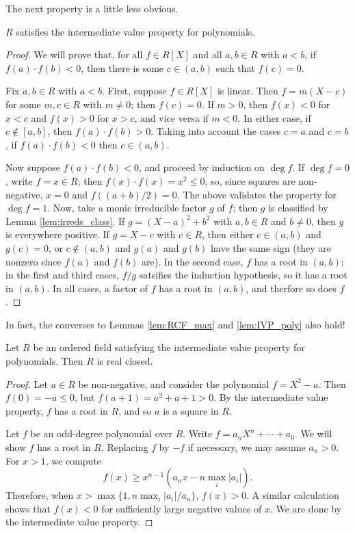 The next property is a little less obvious.

\begin{lemma}
  \label{lem:IVP_poly}
  $R$ satisfies the intermediate value property for polynomials.
\end{lemma}
\begin{proof}
  We will prove that, for all $f\in R[X]$ and all $a,b\in R$ with $a<b$, if $f(a)\cdot f(b)<0$, then there is some $c\in(a,b)$ such that $f(c)=0$.

  Fix $a,b\in R$ with $a<b$. First, suppose $f\in R[X]$ is linear. Then $f=m(X-c)$ for some $m,c\in R$ with $m\neq0$; then $f(c)=0$. If $m>0$, then $f(x)<0$ for $x<c$ and $f(x)>0$ for $x>c$, and vice versa if $m<0$. In either case, if $c\notin[a,b]$, then $f(a)\cdot f(b)>0$. Taking into account the cases $c=a$ and $c=b$, if $f(a)\cdot f(b)<0$ then $c\in(a,b)$.

  Now suppose $f(a)\cdot f(b)<0$, and proceed by induction on $\deg f$. If $\deg f=0$, write $f=x\in R$; then $f(x)\cdot f(x)=x^2\leq 0$, so, since squares are non-negative, $x=0$ and $f((a+b)/2)=0$. The above validates the property for $\deg f=1$. Now, take a monic irreducible factor $g$ of $f$; then $g$ is classified by Lemma \ref{lem:irreds_class}. If $g=(X-a)^2+b^2$ with $a,b\in R$ and $b\neq0$, then $g$ is everywhere positive. If $g=X-c$ with $c\in R$, then either $c\in(a,b)$ and $g(c)=0$, or $c\notin(a,b)$ and $g(a)$ and $g(b)$ have the same sign (they are nonzero since $f(a)$ and $f(b)$ are). In the second case, $f$ has a root in $(a,b)$; in the first and third cases, $f/g$ satsifies the induction hypothesis, so it has a root in $(a,b)$. In all cases, a factor of $f$ has a root in $(a,b)$, and therfore so does $f$.
\end{proof}

In fact, the converses to Lemmas \ref{lem:RCF_max} and \ref{lem:IVP_poly} also hold!

\begin{theorem}
  Let $R$ be an ordered field satisfying the intermediate value property for polynomials. Then $R$ is real closed.
\end{theorem}
\begin{proof}
  Let $a\in R$ be non-negative, and consider the polynomial $f=X^2-a$. Then $f(0)=-a\leq0$, but $f(a+1)=a^2+a+1>0$. By the intermediate value property, $f$ has a root in $R$, and so $a$ is a square in $R$.

  Let $f$ be an odd-degree polynomial over $R$. Write $f=a_nX^n+\cdots+a_0$. We will show $f$ has a root in $R$. Replacing $f$ by $-f$ if necessary, we may assume $a_n>0$. For $x>1$, we compute
  \[f(x)\geq x^{n-1}(a_nx-n\max_i|a_i|).\]
  Therefore, when $x>\max\{1,n\max_i|a_i|/a_n\}$, $f(x)>0$. A similar calculation shows that $f(x)<0$ for sufficiently large negative values of $x$. We are done by the intermediate value property.
\end{proof}

